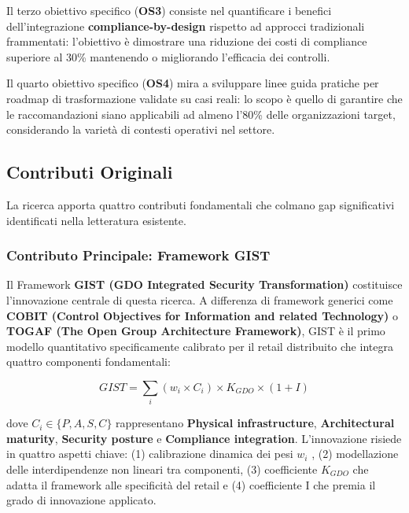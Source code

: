 Il terzo obiettivo specifico (\textbf{OS3}) consiste nel quantificare i benefici dell'integrazione \textbf{compliance-by-design} rispetto ad approcci tradizionali frammentati: l'obiettivo è dimostrare una riduzione dei costi di compliance superiore al 30\% mantenendo o migliorando l'efficacia dei controlli.

Il quarto obiettivo specifico (\textbf{OS4}) mira a sviluppare linee guida
pratiche per roadmap di trasformazione validate su casi reali: lo scopo è quello di garantire che le raccomandazioni siano applicabili ad almeno l'80\% delle organizzazioni target, considerando la varietà di contesti operativi nel settore.

\subsection{\texorpdfstring{\textbf{Contributi Originali}}{1.3.3 Contributi Originali}}\label{contributi-originali}

La ricerca apporta quattro contributi fondamentali che colmano gap significativi identificati nella letteratura esistente.

\subsubsection{\texorpdfstring{\textbf{Contributo Principale: Framework GIST}}{1.3.3.1 Contributo Principale: Framework GIST}}\label{contributi-principale}


Il Framework \textbf{GIST (GDO Integrated Security Transformation)} costituisce l'innovazione centrale di questa ricerca. A differenza di framework generici come \textbf{COBIT (Control Objectives for Information and related Technology)} o \textbf{TOGAF (The Open Group Architecture Framework)}, GIST è il primo modello quantitativo specificamente calibrato per il retail distribuito che integra quattro componenti fondamentali:

\begin{equation}
GIST = \sum_{i} (w_i \times C_i) \times K_{GDO} \times (1 + I)
\end{equation}

dove $C_i \in \{P, A, S, C\}$ rappresentano \textbf{Physical infrastructure}, \textbf{Architectural maturity}, \textbf{Security posture} e \textbf{Compliance integration}. L'innovazione risiede in quattro aspetti chiave: (1) calibrazione dinamica dei pesi $w_i$ , (2) modellazione delle interdipendenze non lineari tra componenti, (3) coefficiente $K_{GDO}$ che adatta il framework alle specificità del retail e (4) coefficiente I che premia il grado di innovazione applicato.

